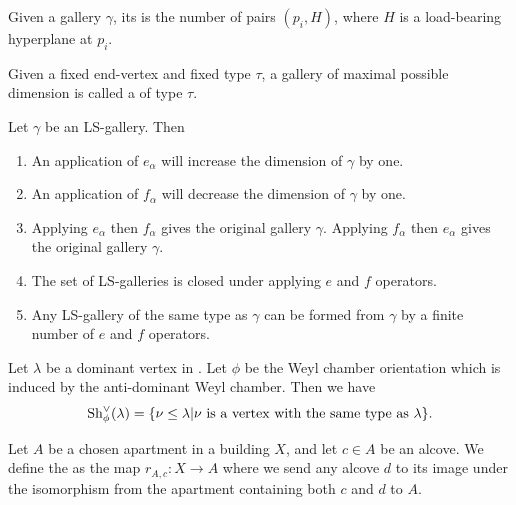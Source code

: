 \documentclass[11pt]{article}
\begin{document}
\begin{definition}
    Given a gallery $\gamma$, its  is the number of pairs $(p_i,H)$, where $H$ is a load-bearing hyperplane at $p_i$. 
\end{definition}

\begin{definition}
    Given a fixed end-vertex and fixed type $\tau$, a gallery of maximal possible dimension is called a  of type $\tau$. 
\end{definition}


\begin{proposition}
    Let $\gamma$ be an LS-gallery. Then
    \begin{enumerate}
        \item An application of $e_\alpha$ will increase the dimension of $\gamma$ by one.
        \item An application of $f_\alpha$ will decrease the dimension of $\gamma$ by one.
        \item Applying $e_\alpha$ then $f_\alpha$ gives the original gallery $\gamma$. Applying $f_\alpha$ then $e_\alpha$ gives the original gallery $\gamma$.
        \item The set of LS-galleries is closed under applying $e$ and $f$ operators.
        \item Any LS-gallery of the same type as $\gamma$ can be formed from $\gamma$ by a finite number of $e$ and $f$ operators.
    \end{enumerate}
\end{proposition}


\begin{proposition}
    Let $\lambda$ be a dominant vertex in \sg. Let $\phi$ be the Weyl chamber orientation which is induced by the anti-dominant Weyl chamber. Then we have
    \[\textnormal{Sh}_\phi^\vee (\lambda)=\{\nu \leq \lambda|\nu \textnormal{ is a vertex with the same type as }\lambda\}.\]
\end{proposition}


\begin{definition}
    Let $A$ be a chosen apartment in a building $X$, and let $c\in A$ be an alcove. We define the  as the map $r_{A,c}:X\longrightarrow A$ where we send any alcove $d$ to its image under the isomorphism from the apartment containing both $c$ and $d$ to $A$. 
\end{definition}
\end{document}
